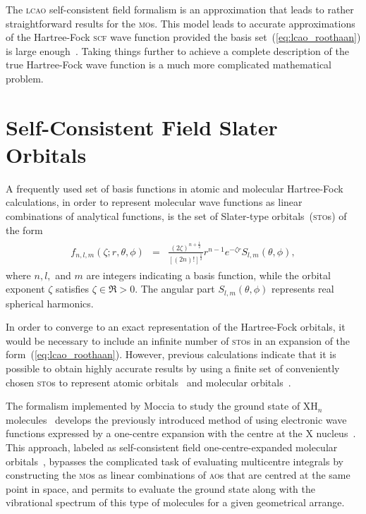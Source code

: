 The \textsc{lcao} self-consistent field formalism is an approximation
that leads to rather straightforward results for the
\textsc{mo}s. This model leads to accurate approximations of the
Hartree-Fock \textsc{scf} wave function provided the basis
set~(\ref{eq:lcao_roothaan}) is large
enough~\cite{EllisonShullh2o_1955, Moccia_JCP_2164, Moccia_JCP_2176,
  Moccia_1964}. Taking things further to achieve a complete
description of the true Hartree-Fock wave function is a much more
complicated mathematical problem.


\section{Self-Consistent Field Slater Orbitals}
\label{ch:scf_sto}

A frequently used set of basis functions in atomic and molecular
Hartree-Fock calculations, in order to represent molecular wave
functions as linear combinations of analytical functions, is the set
of Slater-type orbitals~(\textsc{sto}s) of the form
%
\begin{eqnarray}
  \begin{split}
    f_{n,l,m}(\zeta;r,\theta,\phi) & = &
    \frac{(2\zeta)^{n + \frac{1}{2}}}{[(2n)!]^{\frac{1}{2}}} r^{n-1} e^{-\zeta r}
    S_{l,m}(\theta,\phi),
  \end{split}
  \label{eq:f_STO}
\end{eqnarray}
%
where $n,l,$ and $m$ are integers indicating a basis function, while
the orbital exponent $\zeta$ satisfies $\zeta \in \Re > 0 $. The
angular part $S_{l,m}(\theta,\phi)$ represents real spherical
harmonics.

In order to converge to an exact representation of the Hartree-Fock
orbitals, it would be necessary to include an infinite number of
\textsc{sto}s in an expansion of the
form~(\ref{eq:lcao_roothaan}). However, previous calculations indicate
that it is possible to obtain highly accurate results by using a
finite set of conveniently chosen \textsc{sto}s to represent atomic
orbitals~\cite{Clementi_scfIon_1962,Clementi_STOatoms_1974,Bunge_STOtable_1993}
and molecular
orbitals~\cite{Moccia_JCP_2164,Moccia_JCP_2176,Moccia_1964}.

The formalism implemented by Moccia to study the ground state of
XH$_{n}$ molecules~\cite{Moccia_JCP_2164,Moccia_JCP_2176,Moccia_1964}
develops the previously introduced method of using electronic wave
functions expressed by a one-centre expansion with the centre at the X
nucleus~\cite{Parr_JCP_1960,oneCentre_1961}. This approach, labeled as
self-consistent field one-centre-expanded molecular
orbitals~\cite{Moccia_JCP_2164}, bypasses the complicated task of
evaluating multicentre integrals by constructing the \textsc{mo}s as
linear combinations of \textsc{ao}s that are centred at the same point
in space, and permits to evaluate the ground state along with the
vibrational spectrum of this type of molecules for a given geometrical
arrange.

